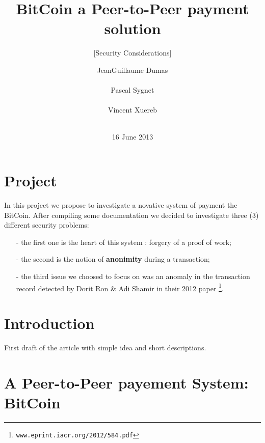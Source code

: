 \documentclass{acm_proc_article-sp}
\begin{document}
\title{BitCoin a Peer-to-Peer payment solution}
\subtitle{[Security Considerations]
}

\author{
\alignauthor
Jean\-Guillaume Dumas\\
       \\
\alignauthor
Pascal Sygnet\\
       \\
\alignauthor 
Vincent Xuereb\\
       \\
}


\date{16 June 2013}
\maketitle

\section{Project}
In this project we propose to investigate a novative system of payment
the BitCoin. After compiling some documentation we decided to investigate
three (3) different security problems:
\begin{itemize}
\item[-] the first one is the heart of this system : forgery of a proof of work;
\item[-] the second is the notion of \textbf{anonimity} 
during a transaction;
\item[-] the third issue we choosed to focus on was an anomaly in
the transaction record detected by Dorit Ron \& Adi Shamir in their 2012 paper
\footnote{\texttt{www.eprint.iacr.org/2012/584.pdf}}.
\end{itemize}
\section{Introduction}
First draft of the article with simple idea and short descriptions.

\section{A Peer-to-Peer payement System: BitCoin}
\end{document}
